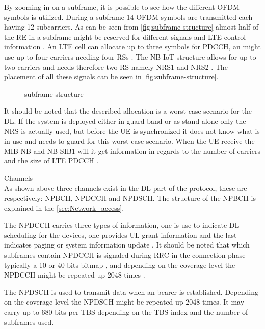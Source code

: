By zooming in on a subframe, it is possible to see how the different \gls{OFDM} symbols is utilized. During a subframe 14 \gls{OFDM} symbols are transmitted each having 12 subcarriers. As can be seen from \autoref{fig:subframe-structure} almost half of the \gls{RE} in a subframe might be reserved for different signals and \gls{LTE} control information \citep{REL-13}. An \gls{LTE} cell can allocate up to three symbols for \gls{PDCCH}, an might use up to four carriers needing four \gls{RS}s \citep{whitepaper}. The \gls{NB-IoT} structure allows for up to two carriers and needs therefore two \gls{RS} namely \gls{NRS}1 and \gls{NRS}2 \citep{REL-13}. The placement of all these signals can be seen in \autoref{fig:subframe-structure}.  

\begin{figure}[H]
\centering

\caption{subframe structure \citep{whitepaper,REL-13}}
\label{fig:subframe-structure}
\end{figure}

It should be noted that the described allocation is a worst case scenario for the \gls{DL}. If the system is deployed either in guard-band or as stand-alone only the \gls{NRS} is actually used, but before the \gls{UE} is synchronized it does not know what is in use and needs to guard for this worst case scenario. When the \gls{UE} receive the \gls{MIB-NB} and \gls{NB-SIB}1 will it get information in regards to the number of carriers and the size of \gls{LTE} \gls{PDCCH} \citep{whitepaper}. 

Channels\\ 
As shown above three channels exist in the \gls{DL} part of the protocol, these are respectively: \gls{NPBCH}, \gls{NPDCCH} and \gls{NPDSCH}. The structure of the \gls{NPBCH} is explained in the \autoref{sec:Network_access}.

The \gls{NPDCCH} carries three types of information, one is use to indicate \gls{DL} scheduling for the devices, one provides \gls{UL} grant information and the last indicates paging or system information update \citep{NB-IoT_Book}. It should be noted that which subframes contain \gls{NPDCCH} is signaled during \gls{RRC} in the connection phase typically a 10 or 40 bits bitmap \citep{whitepaper}, and depending on the coverage level the \gls{NPDCCH} might be repeated up 2048 times \citep{NB-IoT_Book}.

The \gls{NPDSCH} is used to transmit data when an bearer is established. Depending on the coverage level the \gls{NPDSCH} might be repeated up 2048 times. It may carry up to 680 bits per \gls{TBS} depending on the \gls{TBS} index and the number of subframes used. \citep{NB-IoT_Book}

